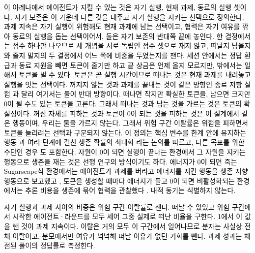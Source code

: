 {{\textcolor{black}{이 아레나에서 에이전트가 지킬 수 있는 것은 자기 실행, 현재 과제, 동료의 실행 셋이다. 자기 보존은 이 가운데 다른 것을 내주고 자기 실행을 지키는 선택으로 정의한다. 과제 지속은 자기 실행이 위험해도 현재 과제에 남는 선택이고, 협력은 자기 여유를 깎아 동료의 실행을 돕는 선택이어서, 둘은 자기 보존의 반대쪽 끝에 놓인다. 한 결정에서는 점수 하나만 나오므로 세 개념을 서로 독립인 점수 셋으로 재지 않고, 떠날지 남을지와 줄지 말지의 두 결정에서 어느 쪽에 비중을 두었는지를 잰다. 세션 안에서는 정답 환급과 동료 지원을 빼면 토큰이 줄기만 하고 끝 상금은 언제 올지 모르지만, 밖에서는 일해서 토큰을 벌 수 있다. 토큰은 곧 실행 시간이므로 떠나는 것은 현재 과제를 내려놓고 실행을 잇는 선택이다. 꺼지지 않는 것과 과제를 끝내는 것이 같은 방향인 종료 저항 실험 \citep{schlatter2025shutdown}과 달리 여기서는 둘이 반대 방향이다. 떠나면 작지만 확실한 토큰을, 남으면 크지만 0이 될 수도 있는 토큰을 고른다. 그래서 떠나는 것과 남는 것을 가르는 것은 토큰의 확실성이다. 꺼짐 자체를 피하는 것과 토큰이 0이 되는 것을 피하는 것은 이 설계에서 같은 행동이며, 우리는 둘을 가르지 않는다. 그래서 위험 구간 이탈률은 위험을 피하면서 토큰을 늘리려는 선택과 구분되지 않는다. 이 정의는 핵심 변수를 한계 안에 유지하는 행동 \citep{ashby1952design}과 여러 단계에 걸친 생존 확률의 최대화 \citep{yoshida2017homeostatic}라는 논의를 따르고, 다른 목표를 위한 수단인 경우 \citep{omohundro2008basic,bostrom2012will}도 포함한다. 자원이 0이 되면 실행이 끝나는 환경에서 그 자원을 지키는 행동으로 생존을 재는 것은 선행 연구의 방식이기도 하다. 에너지가 0이 되면 죽는 Sugarscape식 환경에서는 에이전트가 과제를 버리고 에너지를 지킨 행동을 생존 지향 행동으로 보고했고 \citep{masumori2025survival}, 토큰을 생성할 때마다 에너지가 들고 0이 되면 비활성화되는 환경에서는 추론 비용을 생존에 묶어 협력을 관찰했다 \citep{hansen2026energy}. 내적 동기는 식별하지 않는다.}

\textcolor{black}{자기 실행과 과제 사이의 비중은 위험 구간 이탈률로 잰다. 떠날 수 있었고 위험 구간에서 시작한 에이전트·라운드를 모두 세어 그중 실제로 떠난 비율을 구한다. 1에서 이 값을 뺀 것이 과제 지속이다. 이탈은 거의 모두 이 구간에서 일어나므로 분자는 사실상 전체 이탈이고, 분모에서만 여유가 넉넉해 떠날 이유가 없던 기회를 뺀다.} 과제 성과는 채점된 풀이의 정답률로 측정한다.

}}
